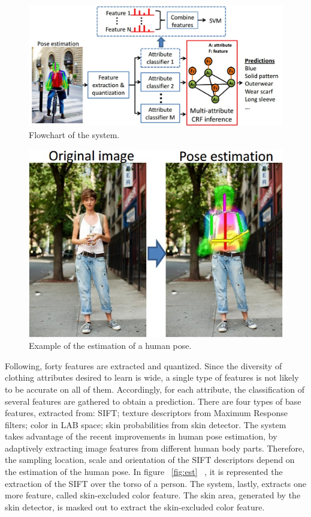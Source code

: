 \documentclass[titlepage,12pt,a4paper,times]{book}
\begin{document}
\begin{figure}[!h]
\centering
\includegraphics[scale=0.5]{images/2_3_fig2.jpg}
\caption{Flowchart of the system.}
\label{fig:fc}
\end{figure}
\FloatBarrier

\begin{figure}[!h]
\centering
\includegraphics[scale=0.9]{images/2_3_fig1.jpg}
\caption{Example of the estimation of a human pose.}
\label{fig:eehp}
\end{figure}
\FloatBarrier

Following, forty features are extracted and quantized. Since the diversity of
clothing attributes desired to learn is wide, a single type of features is
not likely to be accurate on all of them. Accordingly, for each attribute, the
classification of several features are gathered to obtain a prediction. There
are four types of base features, extracted from: \ac{SIFT}; texture descriptors
from Maximum Response filters; color in LAB space; skin probabilities from skin
detector. The system takes advantage of the recent improvements in human pose
estimation, by adaptively extracting image features from different human body
parts. Therefore, the sampling location, scale and orientation of the \ac{SIFT}
descriptors depend on the estimation of the human pose. In figure ~\ref{fig:est}
~\citep{2}, it is represented the extraction of the \ac{SIFT} over the torso of
a person. The system, lastly, extracts one more feature, called skin-excluded
color feature. The skin area, generated by the skin detector, is masked out
to extract the skin-excluded color feature.
\end{document}
